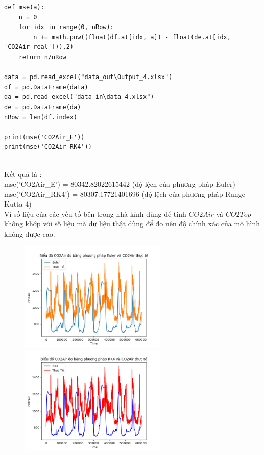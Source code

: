 \documentclass[a4paper]{article}
\begin{document}
\begin{verbatim}
def mse(a):
    n = 0
    for idx in range(0, nRow):
        n += math.pow((float(df.at[idx, a]) - float(de.at[idx, 'CO2Air_real'])),2)
    return n/nRow

data = pd.read_excel("data_out\Output_4.xlsx")
df = pd.DataFrame(data)
da = pd.read_excel("data_in\data_4.xlsx")
de = pd.DataFrame(da)
nRow = len(df.index)

print(mse('CO2Air_E'))
print(mse('CO2Air_RK4'))
\end{verbatim}
\\
Kết quả là :\\
mse('CO2Air\_E') = 80342.82022615442 (độ lệch của phương pháp Euler)\\
mse('CO2Air\_RK4') = 80307.17721401696 (độ lệch của phương pháp Runge-Kutta 4)\\

Vì số liệu của các yếu tố bên trong nhà kính dùng để tính $CO2Air$ và $CO2Top$ không khớp với số liệu mà dữ liệu thật dùng để đo nên độ chính xác của mô hình không được cao. 

\begin{figure}[h]
\begin{center}
\includegraphics[width=7cm]{4b_euler.png}
\includegraphics[width=7cm]{4b_rk4.png}
\end{center}
\end{figure}
\end{document}
